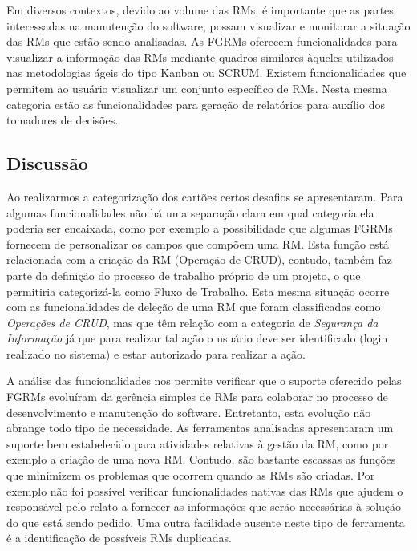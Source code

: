 Em diversos contextos, devido ao volume das RMs, é importante que as partes
interessadas na manutenção do software, possam visualizar e monitorar a situação
das RMs que estão sendo analisadas. As FGRMs oferecem funcionalidades para
visualizar a informação das RMs mediante quadros similares àqueles utilizados
nas metodologias ágeis do tipo Kanban ou SCRUM\@. Existem funcionalidades que
permitem ao usuário visualizar um conjunto específico de RMs. Nesta mesma
categoria estão as funcionalidades para geração de relatórios para auxílio dos
tomadores de decisões.

\subsection{Discussão}
\label{sec:discussao}

Ao realizarmos a categorização dos cartões certos desafios se apresentaram. Para
algumas funcionalidades não há uma separação clara em qual categoria ela poderia
ser encaixada, como por exemplo a possibilidade que algumas FGRMs fornecem de
personalizar os campos que compõem uma RM\@. Esta função está relacionada com a
criação da RM (Operação de CRUD), contudo, também faz parte da definição do
processo de trabalho próprio de um projeto, o que permitiria categorizá-la como
Fluxo de Trabalho. Esta mesma situação ocorre com as funcionalidades de deleção
de uma RM que foram classificadas como \textit{Operações de CRUD}, mas que têm
relação com a categoria de \textit{Segurança da Informação} já que para realizar
tal ação o usuário deve ser identificado (login realizado no sistema) e estar
autorizado para realizar a ação.

A análise das funcionalidades nos permite verificar que o suporte oferecido
pelas FGRMs evoluíram da gerência simples de RMs para colaborar no processo de
desenvolvimento e manutenção do software. Entretanto, esta evolução não abrange
todo tipo de necessidade. As ferramentas analisadas apresentaram um suporte bem
estabelecido para atividades relativas à gestão da RM, como por exemplo a
criação de uma nova RM\@. Contudo, são bastante escassas as funções que
minimizem os problemas que ocorrem quando as RMs são criadas. Por exemplo não
foi possível verificar funcionalidades nativas das RMs que ajudem o responsável
pelo relato a fornecer as informações que serão necessárias à solução do que
está sendo pedido. Uma outra facilidade ausente neste tipo de ferramenta é a
identificação de possíveis RMs duplicadas.

